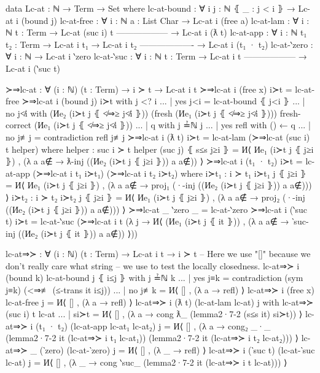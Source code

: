 \begin{code}
  data Lc-at : ℕ → Term → Set where
    lc-at-bound : ∀ {i j : ℕ} ⦃ _ : j < i ⦄ → Lc-at i (bound j)
    lc-at-free : ∀ {i : ℕ} {a : List Char} → Lc-at i (free a)
    lc-at-lam : ∀ {i : ℕ} {t : Term}
      → Lc-at (suc i) t
        ------------------
      → Lc-at i (ƛ t)
    lc-at-app : ∀ {i : ℕ} {t₁ t₂ : Term}
      → Lc-at i t₁
      → Lc-at i t₂
        -------------------
      → Lc-at i (t₁ · t₂)
    lc-at-‵zero : ∀ {i : ℕ} → Lc-at i ‵zero
    lc-at-‵suc : ∀ {i : ℕ} {t : Term}
      → Lc-at i t
        ------------------
      → Lc-at i (‵suc t)

  ≻⇒lc-at : ∀ (i : ℕ) (t : Term) → i ≻ t → Lc-at i t
  ≻⇒lc-at i (free x) i≻t = lc-at-free
  ≻⇒lc-at i (bound j) i≻t with j <? i
  ... | yes j<i = lc-at-bound ⦃ j<i ⦄
  ... | no  j≮i with
    (Иe₂ (i≻t j ⦃ ≮⇒≥ j≮i ⦄))
      (fresh (Иe₁ (i≻t j ⦃ ≮⇒≥ j≮i ⦄)))
      {fresh-correct (Иe₁ (i≻t j ⦃ ≮⇒≥ j≮i ⦄))}
  ...   | q with j ≟ℕ j
  ...     | yes refl with () ← q
  ...     | no  j≢j  = contradiction refl j≢j
  ≻⇒lc-at i (ƛ t) i≻t = lc-at-lam (≻⇒lc-at (suc i) t helper)
    where
      helper : suc i ≻ t
      helper (suc j) ⦃ s≤s j≥i ⦄ =
        И⟨ Иe₁ (i≻t j ⦃ j≥i ⦄)
        , (λ a {a∉} → ƛ-inj ((Иe₂ (i≻t j ⦃ j≥i ⦄)) a {a∉})) ⟩
  ≻⇒lc-at i (t₁ · t₂) i≻t =
    lc-at-app (≻⇒lc-at i t₁ i≻t₁) (≻⇒lc-at i t₂ i≻t₂)
    where
      i≻t₁ : i ≻ t₁
      i≻t₁ j ⦃ j≥i ⦄ =
        И⟨ Иe₁ (i≻t j ⦃ j≥i ⦄)
        , (λ a {a∉} → proj₁ (·-inj ((Иe₂ (i≻t j ⦃ j≥i ⦄)) a {a∉})))
        ⟩
      i≻t₂ : i ≻ t₂
      i≻t₂ j ⦃ j≥i ⦄ =
        И⟨ Иe₁ (i≻t j ⦃ j≥i ⦄)
        , (λ a {a∉} → proj₂ (·-inj ((Иe₂ (i≻t j ⦃ j≥i ⦄)) a {a∉})))
        ⟩
  ≻⇒lc-at _ ‵zero _ = lc-at-‵zero
  ≻⇒lc-at i (‵suc t) i≻t = lc-at-‵suc (≻⇒lc-at i t (λ j →
    И⟨ (Иe₁ (i≻t j ⦃ it ⦄))
    , (λ a {a∉} → ‵suc-inj ((Иe₂ (i≻t j ⦃ it ⦄)) a {a∉})) ⟩))

  lc-at⇒≻ : ∀ (i : ℕ) (t : Term) → Lc-at i t → i ≻ t
  -- Here we use "[]" because we don't really care what string
  -- we use to test the locally closedness.
  lc-at⇒≻ i (bound k) lc-at-bound j ⦃ i≤j ⦄ with j ≟ℕ k
  ... | yes j≡k = contradiction (sym j≡k) (<⇒≢ (≤-trans it i≤j))
  ... | no  j≢k = И⟨ [] , (λ a → refl) ⟩
  lc-at⇒≻ i (free x) lc-at-free j = И⟨ [] , (λ a → refl) ⟩
  lc-at⇒≻ i (ƛ t) (lc-at-lam lc-at) j
    with lc-at⇒≻ (suc i) t lc-at
  ... | si≻t = И⟨ [] , (λ a → cong ƛ_ (lemma2·7-2 (s≤s it) si≻t)) ⟩
  lc-at⇒≻ i (t₁ · t₂) (lc-at-app lc-at₁ lc-at₂) j =
    И⟨ []
    , (λ a → cong₂ _·_
        (lemma2·7-2 it (lc-at⇒≻ i t₁ lc-at₁))
        (lemma2·7-2 it (lc-at⇒≻ i t₂ lc-at₂))) ⟩
  lc-at⇒≻ _ (‵zero) (lc-at-‵zero) j = И⟨ [] , (λ _ → refl) ⟩
  lc-at⇒≻ i (‵suc t) (lc-at-‵suc lc-at) j =
    И⟨ []
    , (λ _ → cong ‵suc_ (lemma2·7-2 it (lc-at⇒≻ i t lc-at))) ⟩
\end{code}

